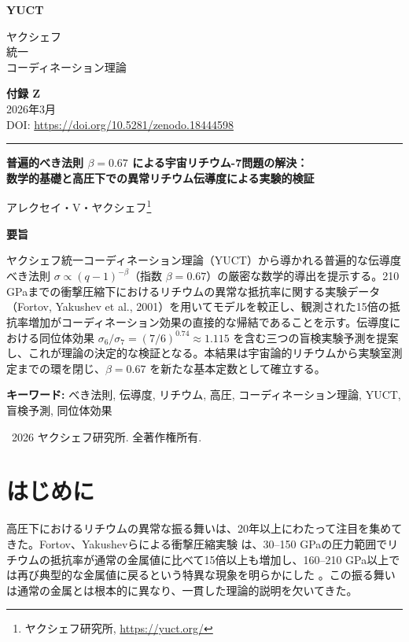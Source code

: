 \documentclass[11pt,a4paper]{article}
\theoremstyle{remark}
\newcommand{\makeheader}{%
	\noindent
	\begin{minipage}{0.17\textwidth}
		\raggedright
		{\sffamily\bfseries\color{skyblue}\fontsize{46}{46}\selectfont YUCT}%
	\end{minipage}%
	\hspace{30pt}
	\begin{minipage}{0.32\textwidth}
		\raggedright
		{\sffamily\fontsize{11}{13}\selectfont ヤクシェフ\\ 統一\\ コーディネーション理論}%
	\end{minipage}%
	\hfill
	\begin{minipage}{0.38\textwidth}
		\raggedleft
		{\sffamily\bfseries 付録 Z}\\
		{\sffamily 2026年3月}\\
		{\sffamily\footnotesize DOI: \url{https://doi.org/10.5281/zenodo.18444598}}%
	\end{minipage}
	\par\vspace{5pt}
	\noindent\textcolor{gold}{\rule{\textwidth}{1.6pt}}
	\par\vspace{0pt}
}
\begin{document}
	\renewcommand{\thepage}{\arabic{page}}
	\thispagestyle{firstpage}
	\makeheader
	
	\vspace{0cm}
	{\LARGE\bfseries 普遍的べき法則 \(\beta = 0.67\) による宇宙リチウム-7問題の解決：\\ 数学的基礎と高圧下での異常リチウム伝導度による実験的検証 \par}
	\vspace{0.2cm}
	
	{\large アレクセイ・V・ヤクシェフ\footnote{ヤクシェフ研究所, \url{https://yuct.org/}}} \\
	\vspace{0.0cm}
	
	{\color{darkblue}\textbf{\LARGE 要旨}} \par
	{\large
		\noindent
		ヤクシェフ統一コーディネーション理論（YUCT）から導かれる普遍的な伝導度べき法則 \(\sigma \propto (q-1)^{-\beta}\)（指数 \(\beta = 0.67\)）の厳密な数学的導出を提示する。210 GPaまでの衝撃圧縮下におけるリチウムの異常な抵抗率に関する実験データ（Fortov, Yakushev et al., 2001）を用いてモデルを較正し、観測された15倍の抵抗率増加がコーディネーション効果の直接的な帰結であることを示す。伝導度における同位体効果 \(\sigma_6/\sigma_7 = (7/6)^{0.74} \approx 1.115\) を含む三つの盲検実験予測を提案し、これが理論の決定的な検証となる。本結果は宇宙論的リチウムから実験室測定までの環を閉じ、\(\beta = 0.67\) を新たな基本定数として確立する。
	}
	
	\vspace{0.1cm}
	\noindent
	{\color{darkblue}\textbf{キーワード:}} べき法則, 伝導度, リチウム, 高圧, コーディネーション理論, YUCT, 盲検予測, 同位体効果
	
	\vspace{0.5cm}
	\noindent
	\textcopyright\ 2026 ヤクシェフ研究所. 全著作権所有.
	
	\tableofcontents
	\newpage
	
	\section{はじめに}
	
	高圧下におけるリチウムの異常な振る舞いは、20年以上にわたって注目を集めてきた。Fortov、Yakushevらによる衝撃圧縮実験 \cite{fortov2001, yakushev2002, fortov1999} は、30–150 GPaの圧力範囲でリチウムの抵抗率が通常の金属値に比べて15倍以上も増加し、160–210 GPa以上では再び典型的な金属値に戻るという特異な現象を明らかにした \cite{fortov2001, yakushev2002}。この振る舞いは通常の金属とは根本的に異なり、一貫した理論的説明を欠いてきた。
	
\end{document}
